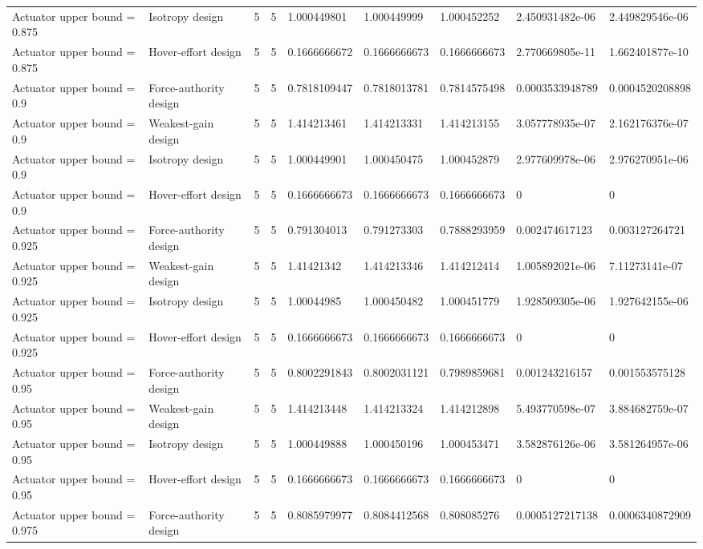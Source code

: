 \begin{tabular}{@{}lllllllll@{}}
Actuator upper bound = 0.875 & Isotropy design & 5 & 5 & 1.000449801 & 1.000449999 & 1.000452252 & 2.450931482e-06 & 2.449829546e-06 \\
Actuator upper bound = 0.875 & Hover-effort design & 5 & 5 & 0.1666666672 & 0.1666666673 & 0.1666666673 & 2.770669805e-11 & 1.662401877e-10 \\
Actuator upper bound = 0.9 & Force-authority design & 5 & 5 & 0.7818109447 & 0.7818013781 & 0.7814575498 & 0.0003533948789 & 0.0004520208898 \\
Actuator upper bound = 0.9 & Weakest-gain design & 5 & 5 & 1.414213461 & 1.414213331 & 1.414213155 & 3.057778935e-07 & 2.162176376e-07 \\
Actuator upper bound = 0.9 & Isotropy design & 5 & 5 & 1.000449901 & 1.000450475 & 1.000452879 & 2.977609978e-06 & 2.976270951e-06 \\
Actuator upper bound = 0.9 & Hover-effort design & 5 & 5 & 0.1666666673 & 0.1666666673 & 0.1666666673 & 0 & 0 \\
Actuator upper bound = 0.925 & Force-authority design & 5 & 5 & 0.791304013 & 0.791273303 & 0.7888293959 & 0.002474617123 & 0.003127264721 \\
Actuator upper bound = 0.925 & Weakest-gain design & 5 & 5 & 1.41421342 & 1.414213346 & 1.414212414 & 1.005892021e-06 & 7.11273141e-07 \\
Actuator upper bound = 0.925 & Isotropy design & 5 & 5 & 1.00044985 & 1.000450482 & 1.000451779 & 1.928509305e-06 & 1.927642155e-06 \\
Actuator upper bound = 0.925 & Hover-effort design & 5 & 5 & 0.1666666673 & 0.1666666673 & 0.1666666673 & 0 & 0 \\
Actuator upper bound = 0.95 & Force-authority design & 5 & 5 & 0.8002291843 & 0.8002031121 & 0.7989859681 & 0.001243216157 & 0.001553575128 \\
Actuator upper bound = 0.95 & Weakest-gain design & 5 & 5 & 1.414213448 & 1.414213324 & 1.414212898 & 5.493770598e-07 & 3.884682759e-07 \\
Actuator upper bound = 0.95 & Isotropy design & 5 & 5 & 1.000449888 & 1.000450196 & 1.000453471 & 3.582876126e-06 & 3.581264957e-06 \\
Actuator upper bound = 0.95 & Hover-effort design & 5 & 5 & 0.1666666673 & 0.1666666673 & 0.1666666673 & 0 & 0 \\
Actuator upper bound = 0.975 & Force-authority design & 5 & 5 & 0.8085979977 & 0.8084412568 & 0.808085276 & 0.0005127217138 & 0.0006340872909 \\

\end{tabular}
